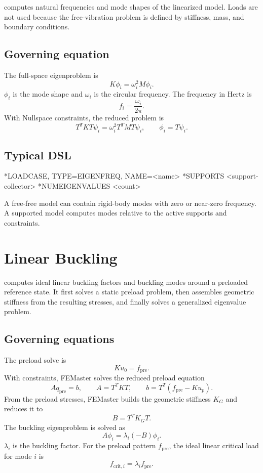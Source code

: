  computes natural frequencies and mode shapes of the linearized model. Loads are not used because the free-vibration problem is defined by stiffness, mass, and boundary conditions.

\subsection{Governing equation}

The full-space eigenproblem is
\[
K\phi_i = \omega_i^2 M\phi_i .
\]
\(\phi_i\) is the mode shape and \(\omega_i\) is the circular frequency. The frequency in Hertz is
\[
f_i = \frac{\omega_i}{2\pi}.
\]
With Nullspace constraints, the reduced problem is
\[
T^TKT\psi_i = \omega_i^2 T^TMT\psi_i,
\qquad
\phi_i=T\psi_i .
\]

\subsection{Typical DSL}

\begin{syntax}
*LOADCASE, TYPE=EIGENFREQ, NAME=<name>
  *SUPPORTS
  <support-collector>
  *NUMEIGENVALUES
  <count>
\end{syntax}

A free-free model can contain rigid-body modes with zero or near-zero frequency. A supported model computes modes relative to the active supports and constraints.

\section{Linear Buckling}
\label{sec:loadcase-linear-buckling}

 computes ideal linear buckling factors and buckling modes around a preloaded reference state. It first solves a static preload problem, then assembles geometric stiffness from the resulting stresses, and finally solves a generalized eigenvalue problem.

\subsection{Governing equations}

The preload solve is
\[
K u_0 = f_\mathrm{pre}.
\]
With constraints, FEMaster solves the reduced preload equation
\[
A q_\mathrm{pre}=b,\qquad A=T^TKT,\qquad b=T^T(f_\mathrm{pre}-Ku_p).
\]
From the preload stresses, FEMaster builds the geometric stiffness \(K_G\) and reduces it to
\[
B=T^T K_G T .
\]
The buckling eigenproblem is solved as
\[
A\phi_i=\lambda_i(-B)\phi_i .
\]
\(\lambda_i\) is the buckling factor. For the preload pattern \(f_\mathrm{pre}\), the ideal linear critical load for mode \(i\) is
\[
f_{\mathrm{crit},i} = \lambda_i f_\mathrm{pre}.
\]

